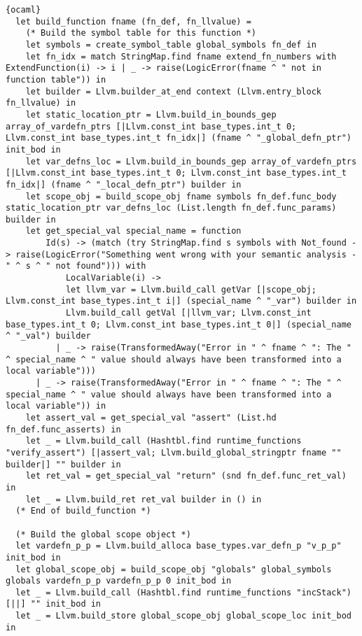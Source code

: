 \begin{lstlisting}{ocaml}
  let build_function fname (fn_def, fn_llvalue) =
    (* Build the symbol table for this function *)
    let symbols = create_symbol_table global_symbols fn_def in
    let fn_idx = match StringMap.find fname extend_fn_numbers with ExtendFunction(i) -> i | _ -> raise(LogicError(fname ^ " not in function table")) in
    let builder = Llvm.builder_at_end context (Llvm.entry_block fn_llvalue) in
    let static_location_ptr = Llvm.build_in_bounds_gep array_of_vardefn_ptrs [|Llvm.const_int base_types.int_t 0; Llvm.const_int base_types.int_t fn_idx|] (fname ^ "_global_defn_ptr") init_bod in
    let var_defns_loc = Llvm.build_in_bounds_gep array_of_vardefn_ptrs [|Llvm.const_int base_types.int_t 0; Llvm.const_int base_types.int_t fn_idx|] (fname ^ "_local_defn_ptr") builder in
    let scope_obj = build_scope_obj fname symbols fn_def.func_body static_location_ptr var_defns_loc (List.length fn_def.func_params) builder in
    let get_special_val special_name = function
        Id(s) -> (match (try StringMap.find s symbols with Not_found -> raise(LogicError("Something went wrong with your semantic analysis - " ^ s ^ " not found"))) with
            LocalVariable(i) ->
            let llvm_var = Llvm.build_call getVar [|scope_obj; Llvm.const_int base_types.int_t i|] (special_name ^ "_var") builder in
            Llvm.build_call getVal [|llvm_var; Llvm.const_int base_types.int_t 0; Llvm.const_int base_types.int_t 0|] (special_name ^ "_val") builder
          | _ -> raise(TransformedAway("Error in " ^ fname ^ ": The " ^ special_name ^ " value should always have been transformed into a local variable")))
      | _ -> raise(TransformedAway("Error in " ^ fname ^ ": The " ^ special_name ^ " value should always have been transformed into a local variable")) in
    let assert_val = get_special_val "assert" (List.hd fn_def.func_asserts) in
    let _ = Llvm.build_call (Hashtbl.find runtime_functions "verify_assert") [|assert_val; Llvm.build_global_stringptr fname "" builder|] "" builder in
    let ret_val = get_special_val "return" (snd fn_def.func_ret_val) in
    let _ = Llvm.build_ret ret_val builder in () in
  (* End of build_function *)

  (* Build the global scope object *)
  let vardefn_p_p = Llvm.build_alloca base_types.var_defn_p "v_p_p" init_bod in
  let global_scope_obj = build_scope_obj "globals" global_symbols globals vardefn_p_p vardefn_p_p 0 init_bod in
  let _ = Llvm.build_call (Hashtbl.find runtime_functions "incStack") [||] "" init_bod in
  let _ = Llvm.build_store global_scope_obj global_scope_loc init_bod in


\end{lstlisting}
